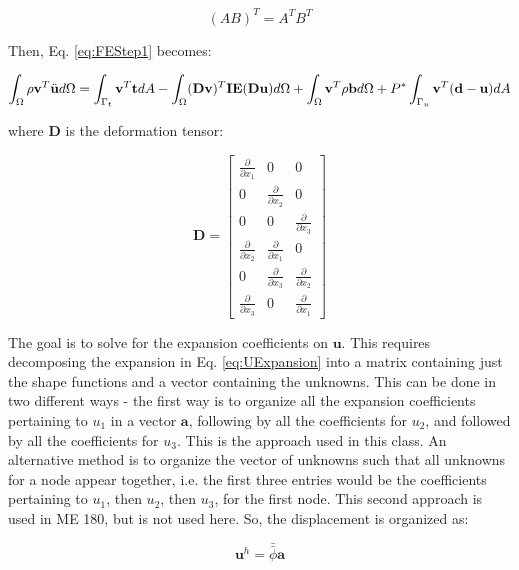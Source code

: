 \documentclass[10pt]{article}
\begin{document}
\begin{equation}
(AB)^T=A^TB^T
\end{equation}


Then, Eq. \eqref{eq:FEStep1} becomes:

\begin{equation}
\int_{\Omega}\rho\textbf{v}^T\ddot{\textbf{u}}d\Omega=\int_{\Gamma_t}\textbf{v}^T\textbf{t}dA- \int_{\Omega}(\textbf{D}\textbf{v})^T\textbf{IE}(\textbf{D}\textbf{u})d\Omega +\int_{\Omega}\textbf{v}^T\rho\textbf{b}d\Omega+P^{*}\int_{\Gamma_u}\textbf{v}^T(\textbf{d}-\textbf{u})dA\\
\end{equation}

where \(\textbf{D}\) is the deformation tensor:

\begin{equation}
\label{eq:D}
\textbf{D}=\begin{bmatrix}\frac{\partial}{\partial x_1} & 0 & 0\\
0 & \frac{\partial}{\partial x_2} & 0\\
0 & 0 & \frac{\partial}{\partial x_3}\\
\frac{\partial}{\partial x_2} & \frac{\partial}{\partial x_1} & 0\\
0 & \frac{\partial}{\partial x_3} & \frac{\partial}{\partial x_2}\\
\frac{\partial}{\partial x_3} & 0 & \frac{\partial}{\partial x_1}\end{bmatrix}
\end{equation}

The goal is to solve for the expansion coefficients on \(\textbf{u}\). This requires decomposing the expansion in Eq. \eqref{eq:UExpansion} into a matrix containing just the shape functions and a vector containing the unknowns. This can be done in two different ways - the first way is to organize all the expansion coefficients pertaining to \(u_1\) in a vector \(\textbf{a}\), following by all the coefficients for \(u_2\), and followed by all the coefficients for \(u_3\). This is the approach used in this class. An alternative method is to organize the vector of unknowns such that all unknowns for a node appear together, i.e. the first three entries would be the coefficients pertaining to \(u_1\), then \(u_2\), then \(u_3\), for the first node. This second approach is used in ME 180, but is not used here. So, the displacement is organized as:

\begin{equation}
\textbf{u}^h=\bar{\bar{\phi}}\textbf{a}
\end{equation}
\end{document}
